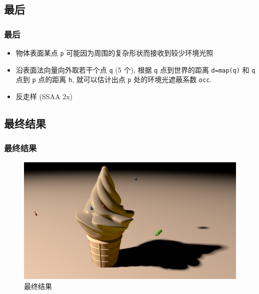 \documentclass[aspectratio=169]{ctexbeamer} %
\begin{document}
\subsection{最后}
\begin{frame}
    \frametitle{最后}
    \begin{itemize}
        \item 物体表面某点 \texttt{p} 可能因为周围的复杂形状而接收到较少环境光照
        \item 沿表面法向量向外取若干个点 \texttt{q} (5 个), 根据 \texttt{q} 点到世界的距离 \texttt{d=map(q)} 和 \texttt{q} 点到 \texttt{p} 点的距离 \texttt{h}, 就可以估计出点 \texttt{p} 处的环境光遮蔽系数 \texttt{occ}.
        \item 反走样 (SSAA 2x)
    \end{itemize}
\end{frame}

\subsection{最终结果}
\begin{frame}
    \frametitle{最终结果}
    \begin{figure}[htbp]
        \centering
        \includegraphics[height=.75\textheight]{images/pre/full.pdf}
        \caption{最终结果}
        \label{fig:final}
    \end{figure}
\end{frame}
\end{document}

